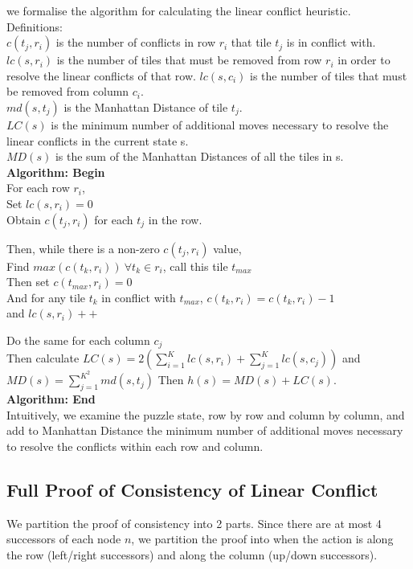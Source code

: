 \documentclass{llncs}
\begin{document}
we formalise the algorithm for calculating the linear conflict heuristic. \\
Definitions: \\
$c(t_j,r_i)$ is the number of conflicts in row $r_i$ that tile $t_j$ is in conflict with. \\
$lc(s, r_i)$ is the number of tiles that must be removed from row $r_i$ in order to resolve the linear conflicts of that row. $lc(s, c_i)$ is the number of tiles that must be removed from column $c_i$.  \\
$md(s, t_j)$ is the Manhattan Distance of tile $t_j$. \\
$LC(s)$ is the minimum number of additional moves necessary to resolve the linear conflicts in the current state s.\\
$MD(s)$ is the sum of the Manhattan Distances of all the tiles in s. \\

\textbf{Algorithm: Begin} \\
 
For each row $r_i$, \\
Set $lc(s, r_i) = 0$ \\
Obtain $c(t_j,r_i)$ for each $t_j$ in the row.

Then, while there is a non-zero $c(t_j,r_i)$ value, \\
    Find $max(c(t_k,r_i)) \ \forall t_k \in r_i$, call this tile $t_{max}$  \\
    Then set $c(t_{max},r_i) = 0$ \\
    And for any tile $t_k$ in conflict with $t_{max}$, $c(t_k,r_i) = c(t_k,r_i) - 1$ \\
    and $lc(s, r_i)++$

Do the same for each column $c_j$ \\
Then calculate $LC(s) = 2(\sum^K_{i=1} lc(s,r_i) + \sum^K_{j=1} lc(s,c_j))$
and  $MD(s) = \sum^{K^2}_{j=1}md(s,t_j)$
Then  $h(s) = MD(s) + LC(s)$. \\

\textbf{Algorithm: End} \\

Intuitively, we examine the puzzle state, row by row and column by column, and add to Manhattan Distance the minimum number of additional moves
necessary to resolve the conflicts within each row and column.

\subsection{Full Proof of Consistency of Linear Conflict}
We partition the proof of consistency into 2 parts. Since there are at most 4 successors of each node $n$, we partition the proof into when the action is along the row (left/right successors) and along the column (up/down successors).
\end{document}
